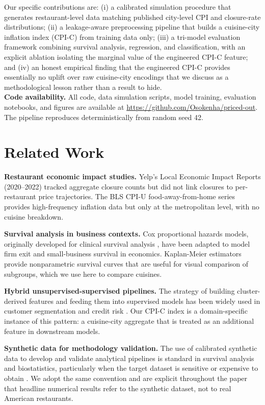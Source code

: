 \documentclass{article}
\begin{document}
Our specific contributions are: (i) a calibrated simulation procedure that generates restaurant-level data matching published city-level CPI and closure-rate distributions; (ii) a leakage-aware preprocessing pipeline that builds a cuisine-city inflation index (CPI-C) from training data only; (iii) a tri-model evaluation framework combining survival analysis, regression, and classification, with an explicit ablation isolating the marginal value of the engineered CPI-C feature; and (iv) an honest empirical finding that the engineered CPI-C provides essentially no uplift over raw cuisine-city encodings that we discuss as a methodological lesson rather than a result to hide.\\



\textbf{Code availability.} All code, data simulation scripts, model training, evaluation notebooks, and figures are available at \url{https://github.com/Osokenha/priced-out}. The pipeline reproduces deterministically from random seed 42.

\section{Related Work}

\textbf{Restaurant economic impact studies.} Yelp's Local Economic Impact Reports (2020--2022) tracked aggregate closure counts but did not link closures to per-restaurant price trajectories. The BLS CPI-U food-away-from-home series provides high-frequency inflation data but only at the metropolitan level, with no cuisine breakdown.

\textbf{Survival analysis in business contexts.} Cox proportional hazards models, originally developed for clinical survival analysis \cite{cox1972}, have been adapted to model firm exit and small-business survival in economics. Kaplan-Meier estimators \cite{km1958} provide nonparametric survival curves that are useful for visual comparison of subgroups, which we use here to compare cuisines.

\textbf{Hybrid unsupervised-supervised pipelines.} The strategy of building cluster-derived features and feeding them into supervised models has been widely used in customer segmentation \cite{kmeansseg} and credit risk \cite{creditrisk}. Our CPI-C index is a domain-specific instance of this pattern: a cuisine-city aggregate that is treated as an additional feature in downstream models.

\textbf{Synthetic data for methodology validation.} The use of calibrated synthetic data to develop and validate analytical pipelines is standard in survival analysis and biostatistics, particularly when the target dataset is sensitive or expensive to obtain \cite{synthsurv}. We adopt the same convention and are explicit throughout the paper that headline numerical results refer to the synthetic dataset, not to real American restaurants.
\end{document}
